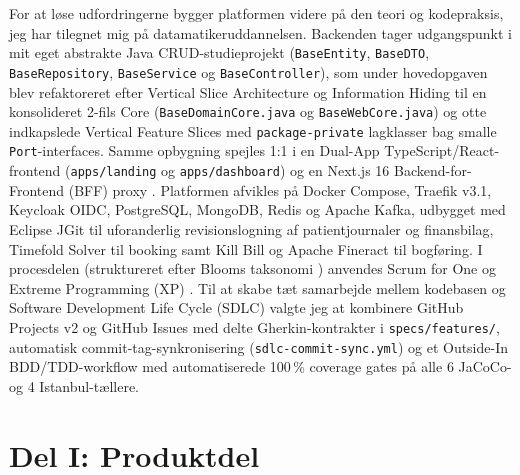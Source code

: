 \documentclass[11pt,a4paper]{article}
\begin{document}
\begin{titlepage}
\begin{minipage}{0.92\textwidth}
        For at løse udfordringerne bygger platformen videre på den teori og kodepraksis, jeg har tilegnet mig på datamatikeruddannelsen. Backenden tager udgangspunkt i mit eget abstrakte Java CRUD-studieprojekt (\texttt{BaseEntity}, \texttt{BaseDTO}, \texttt{BaseRepository}, \texttt{BaseService} og \texttt{BaseController}), som under hovedopgaven blev refaktoreret efter Vertical Slice Architecture \cite{bogard2018} og Information Hiding \cite{parnas1972} til en konsolideret 2-fils Core (\texttt{BaseDomainCore.java} og \texttt{BaseWebCore.java}) og otte indkapslede Vertical Feature Slices med \texttt{package-private} lagklasser bag smalle \texttt{Port}-interfaces. Samme opbygning spejles 1:1 i en Dual-App TypeScript/React-frontend (\texttt{apps/landing} og \texttt{apps/dashboard}) og en Next.js 16 Backend-for-Frontend (BFF) proxy \cite{newman2021}. Platformen afvikles på Docker Compose, Traefik v3.1, Keycloak OIDC, PostgreSQL, MongoDB, Redis og Apache Kafka, udbygget med Eclipse JGit \cite{jgit2024} til uforanderlig revisionslogning af patientjournaler og finansbilag, Timefold Solver til booking samt Kill Bill og Apache Fineract til bogføring.
        I procesdelen (struktureret efter Blooms taksonomi \cite{bloom1956}) anvendes Scrum for One \cite{schwaber2020} og Extreme Programming (XP) \cite{beck2004}. Til at skabe tæt samarbejde mellem kodebasen og Software Development Life Cycle (SDLC) valgte jeg at kombinere GitHub Projects v2 og GitHub Issues med delte Gherkin-kontrakter i \texttt{specs/features/}, automatisk commit-tag-synkronisering (\texttt{sdlc-commit-sync.yml}) og et Outside-In BDD/TDD-workflow med automatiserede 100\,\% coverage gates på alle 6 JaCoCo- og 4 Istanbul-tællere.
    \end{minipage}
    \vfill
\end{titlepage}
\setcounter{page}{2}

{\singlespacing \tableofcontents}
\newpage

\part*{Del I: Produktdel}

\end{document}
